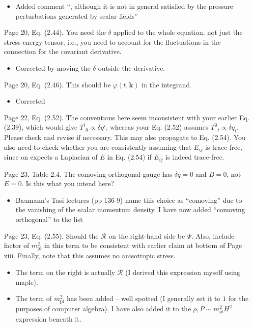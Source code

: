 \documentclass[11pt]{article}
\newcommand{\todo}[1]{{\color{red} #1}}
\begin{document}
\begin{enumerate}
\begin{itemize}
    \item Added comment ``, although it is not in general satisfied
      by the pressure perturbations generated by scalar fields''
  \end{itemize}
\item Page 20, Eq. (2.44). You need the $\delta$ applied to the whole
  equation, not just the stress-energy tensor, i.e., you need to
  account for the fluctuations in the connection for the covariant
  derivative.
  \begin{itemize}
    \item Corrected by moving the $\delta$ outside the derivative.
  \end{itemize}
\item Page 20, Eq. (2.46). This should be $\varphi(t,\mathbf{k})$ in
  the integrand.
  \begin{itemize}
    \item Corrected
  \end{itemize}
  \todo{
\item Page 22, Eq. (2.52). The conventions here seem inconsistent with
  your earlier Eq. (2.39), which would give $T^i{}_0 \propto \delta
  q^i$, whereas your Eq. (2.52) assumes $T^0{}_i \propto \delta
  q_i$. Please check and revise if necessary. This may also propagate
  to Eq. (2.54). You also need to check whether you are consistently
  assuming that $E_{ij}$ is trace-free, since on expects a Laplacian
  of $E$ in Eq. (2.54) if $E_{ij}$ is indeed trace-free.
}
\item Page 23, Table 2.4. The comoving orthogonal gauge has $\delta q
  = 0$ and $B=0$, not $E=0$. Is this what you intend here?
  \begin{itemize}
    \item Baumann's Tasi lectures (pp 136-9) name this choice as ``comoving'' due to the vanishing of the scalar momentum density. I have now added ``comoving orthogonal'' to the list
  \end{itemize}
\item Page 23, Eq. (2.55). Should the $\mathcal{R}$ on the right-hand
  side be $\Psi$. Also, include factor of $m_{\text{pl}}^2$ in this
  term to be consistent with earlier claim at bottom of Page
  xiii. Finally, note that this assumes no anisotropic stress.
  \begin{itemize}
    \item The term on the right is actually $\mathcal{R}$ (I derived this expression myself using maple). 
    \item The term of $m_{\text{pl}}^2$ has been added -- well spotted (I generally set it to $1$ for the purposes of computer algebra). I have also added it to the $\rho,P\sim m_\text{pl}^2 H^2$ expression beneath it.

\end{itemize}
\end{enumerate}
\end{document}
